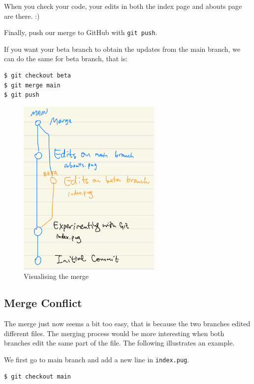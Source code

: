 When you check your code, your edits in both the index page and abouts page are there. :)

Finally, push our merge to GitHub with \texttt{git push}.
\vspace{6mm}

If you want your beta branch to obtain the updates from the main branch, we can do the same for beta branch, that is:
\vspace{6mm}

\begin{lstlisting}[language=bash]
$ git checkout beta
$ git merge main
$ git push
\end{lstlisting}

\begin{figure}[h]
\centering
\includegraphics[width=7cm]{images/ch8-merge-safe.png}
\caption{Visualising the merge}
\end{figure}

\subsection{Merge Conflict}
\label{sec:mergeconflict}
The merge just now seems a bit too easy, that is because the two branches edited different files. The merging process would be more interesting when both branches edit the same part of the file. The following illustrates an example.
\vspace{6mm}

We first go to main branch and add a new line in \texttt{index.pug}.
\vspace{6mm}

\begin{lstlisting}[language=bash]
$ git checkout main
\end{lstlisting}

